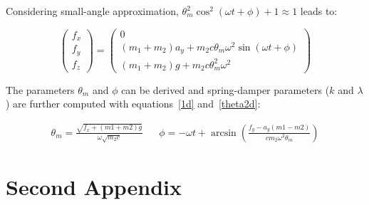 \documentclass[\main/main.tex]{subfiles}
\begin{document}
Considering small-angle  approximation, $\theta_m^2 \cos^2(\omega t + \phi) + 1 \approx 1$ leads to:

\begin{equation}
  \begin{pmatrix}
  f_x \\
  f_y \\
  f_z
  \end{pmatrix}
  =
  \begin{pmatrix}
  0 \\
  (m_1 + m_2) a_y + m_2 c \theta_m \omega^2 \sin(\omega t + \phi) \\
  (m_1 + m_2) g + m_2 c \theta_m^2 \omega^2
  \end{pmatrix}
\end{equation}



The parameters $\theta_m$ and $\phi$ can be derived and spring-damper parameters ($k$ and $\lambda$) are further computed with equations~\eqref{1d} and~\eqref{theta2d}:

\begin{align}
  \theta_m = \frac{\sqrt{f_x + (m1 + m2) g}}{ \omega \sqrt{m_2 c}} &&
  \phi = - \omega t + \arcsin \left( \frac{f_y - a_y (m1 - m2)}{c m_2 \omega^2 \theta_m} \right)
\end{align}



\chapter{Second Appendix}
\end{document}
